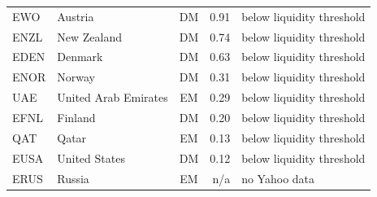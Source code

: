 \begin{tabular}{llcrl}
EWO & Austria & DM & 0.91 & below liquidity threshold \\
ENZL & New Zealand & DM & 0.74 & below liquidity threshold \\
EDEN & Denmark & DM & 0.63 & below liquidity threshold \\
ENOR & Norway & DM & 0.31 & below liquidity threshold \\
UAE & United Arab Emirates & EM & 0.29 & below liquidity threshold \\
EFNL & Finland & DM & 0.20 & below liquidity threshold \\
QAT & Qatar & EM & 0.13 & below liquidity threshold \\
EUSA & United States & DM & 0.12 & below liquidity threshold \\
ERUS & Russia & EM & n/a & no Yahoo data \\
\bottomrule
\end{tabular}